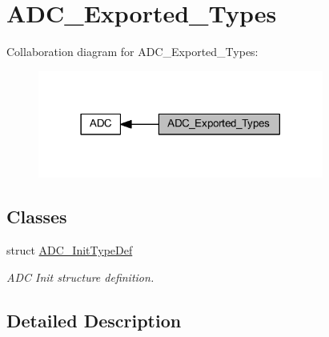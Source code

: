 \hypertarget{group___a_d_c___exported___types}{}\section{A\+D\+C\+\_\+\+Exported\+\_\+\+Types}
\label{group___a_d_c___exported___types}
Collaboration diagram for A\+D\+C\+\_\+\+Exported\+\_\+\+Types\+:
\nopagebreak
\begin{figure}[H]
\begin{center}
\leavevmode
\includegraphics[width=266pt]{group___a_d_c___exported___types}
\end{center}
\end{figure}
\subsection*{Classes}
\begin{DoxyCompactItemize}
\item 
struct \hyperlink{struct_a_d_c___init_type_def}{A\+D\+C\+\_\+\+Init\+Type\+Def}
\begin{DoxyCompactList}\small\item\em A\+DC Init structure definition. \end{DoxyCompactList}\end{DoxyCompactItemize}


\subsection{Detailed Description}
